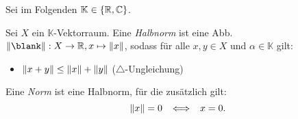 \documentclass{cheat-sheet}
\newcommand{\K}{\mathbb{K}}
\begin{document}





\begin{nota}
  Sei im Folgenden $\K \in \{ \R, \C \}$.
\end{nota}

\begin{defn}
  Sei $X$ ein $\K$-Vektorraum. Eine \emph{Halbnorm} ist eine Abb. $\norm{\blank} : X \to \R, x \mapsto \norm{x}$, sodass für alle $x, y \in X$ und $\alpha \in \K$ gilt:
  \begin{itemize}
    \item $\lVert x + y\rVert \leq \lVert x\rVert + \lVert y\rVert$ \enspace ($\triangle$-Ungleichung)
  \end{itemize}
  Eine \emph{Norm} ist eine Halbnorm, für die zusätzlich gilt:
  \[ \lVert x\rVert = 0 \enspace \iff \enspace x = 0. \]
\end{defn}
\end{document}

